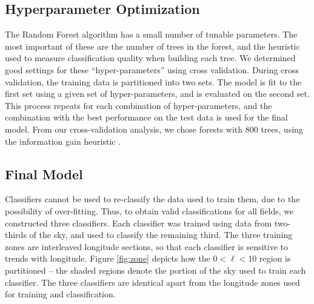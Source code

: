 \subsection{Hyperparameter Optimization}
The Random Forest algorithm has a small number of tunable parameters. The most important of these are the number of trees in the forest, and the heuristic used to measure classification quality when building each tree. We determined good settings for these ``hyper-parameters'' using cross validation. During cross validation, the training data is partitioned into two sets. The model is fit to the first set using a given set of hyper-parameters, and is evaluated on the second set. This process repeats for each combination of hyper-parameters, and the combination with the best performance on the test data is used for the final model. From our cross-validation analysis, we chose forests with 800 trees, using the information gain heuristic \citep{Raileanu04}.

\subsection{Final Model}

Classifiers cannot be used to re-classify the data used to train them, due to the possibility of over-fitting. Thus, to obtain valid classifications for all fields, we constructed three classifiers. Each classifier was trained using data from two-thirds of the sky, and used to classify the remaining third. The three training zones are interleaved longitude sections, so that each classifier is sensitive to trends with longitude. Figure \ref{fig:zone} depicts how the $0 < \ell < 10$ region is partitioned -- the shaded regions denote the portion of the sky used to train each classifier. The three classifiers are identical apart from the longitude zones used for training and classification.

